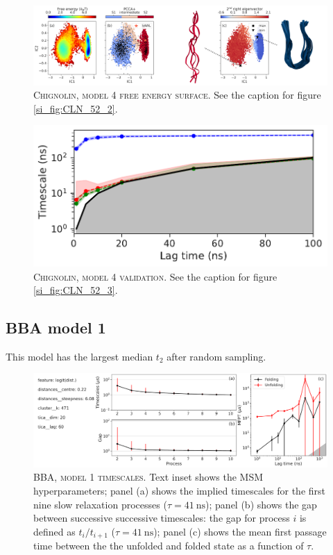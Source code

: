 \documentclass{article}
\begin{document}
\begin{figure}[h]
    \centering
    \includegraphics[width=\columnwidth]{SI_figures/CLN_93_SI2.png}
    \caption{\textsc{Chignolin,  model 4 free energy surface}. See the caption for figure \ref{si_fig:CLN_52_2}.}
    \label{si_fig:CLN_93_2}
\end{figure}

\begin{figure}[h]
    \centering
    \includegraphics[height=0.15\textheight]{SI_figures/CLN_93_its.pdf}
    \caption{\textsc{Chignolin, model 4 validation}. See the caption for figure \ref{si_fig:CLN_52_3}.}
    \label{si_fig:CLN_93_3}
\end{figure}

\FloatBarrier
\clearpage


\subsection{BBA model 1}

This model has the largest median $t_{2}$ after random sampling.

\begin{figure}[h]
    \centering
    \includegraphics[width=\columnwidth]{SI_figures/BBA_24_SI-1.pdf}
    \caption{\textsc{BBA,  model 1 timescales.} Text inset shows the MSM hyperparameters; panel (a) shows the implied timescales for the first nine slow relaxation processes ($\tau=\SI{41}{\nano\second}$); panel (b) shows the gap between successive successive timescales: the gap for process $i$ is defined as $t_{i}/t_{i+1}$ ($\tau=\SI{41}{\nano\second}$); panel (c) shows the mean first passage time between the the unfolded and folded state as a function of $\tau$.}
    \label{si_fig:BBA_24_1}
\end{figure}
\end{document}
